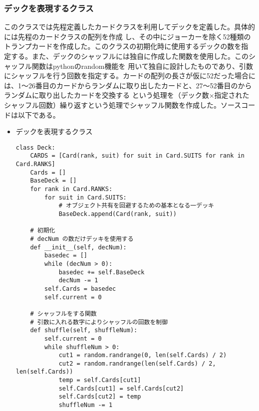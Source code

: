 \subsubsection{デックを表現するクラス}
このクラスでは先程定義したカードクラスを利用してデックを定義した。具体的には先程のカードクラスの配列を作成
し、その中にジョーカーを除く52種類のトランプカードを作成した。このクラスの初期化時に使用するデックの数を指
定する。また、デックのシャッフルには独自に作成した関数を使用した。このシャッフル関数はpythonのrandom機能を
用いて独自に設計したものであり、引数にシャッフルを行う回数を指定する。カードの配列の長さが仮に52だった場合に
は、1～26番目のカードからランダムに取り出したカードと、27～52番目のからランダムに取り出したカードを交換する
という処理を（デック数×指定されたシャッフル回数）繰り返すという処理でシャッフル関数を作成した。ソースコードは以下である。
\begin{itemize}
\item デックを表現するクラス
\begin{lstlisting}
class Deck:
    CARDS = [Card(rank, suit) for suit in Card.SUITS for rank in Card.RANKS]
    Cards = []
    BaseDeck = []
    for rank in Card.RANKS:
        for suit in Card.SUITS:
            # オブジェクト共有を回避するための基本となる一デッキ
            BaseDeck.append(Card(rank, suit))  

    # 初期化
    # decNum の数だけデッキを使用する
    def __init__(self, decNum):
        basedec = []
        while (decNum > 0):
            basedec += self.BaseDeck
            decNum -= 1
        self.Cards = basedec
        self.current = 0

    # シャッフルをする関数
    # 引数に入れる数字によりシャッフルの回数を制御
    def shuffle(self, shuffleNum):
        self.current = 0
        while shuffleNum > 0:
            cut1 = random.randrange(0, len(self.Cards) / 2)
            cut2 = random.randrange(len(self.Cards) / 2, len(self.Cards))
            temp = self.Cards[cut1]
            self.Cards[cut1] = self.Cards[cut2]
            self.Cards[cut2] = temp
            shuffleNum -= 1
\end{lstlisting}
\end{itemize}


